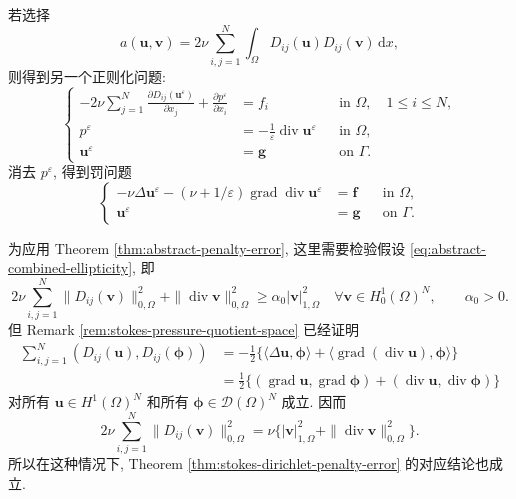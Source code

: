 \setcounter{statement}{3}
\begin{Remark}\label{rem:stokes-dirichlet-strain-penalty}
若选择
\[
a(\mathbf{u},\mathbf{v})
=2\nu\sum_{i,j=1}^{N}
\int_\Omega
D_{ij}(\mathbf{u})D_{ij}(\mathbf{v})\,\mathrm{d}x,
\]
则得到另一个正则化问题:
\[
\left\{
\begin{aligned}
-2\nu\sum_{j=1}^{N}
\frac{\partial D_{ij}(\mathbf{u}^\varepsilon)}
{\partial x_j}
+\frac{\partial p^\varepsilon}{\partial x_i}
&=f_i
&&\text{in }\Omega,\quad 1\le i\le N,\\
p^\varepsilon
&=-\frac1\varepsilon
\operatorname{div}\mathbf{u}^\varepsilon
&&\text{in }\Omega,\\
\mathbf{u}^\varepsilon&=\mathbf{g}
&&\text{on }\Gamma.
\end{aligned}
\right.
\]
消去 $p^\varepsilon$, 得到罚问题
\[
\left\{
\begin{aligned}
-\nu\Delta\mathbf{u}^\varepsilon
-(\nu+1/\varepsilon)
\operatorname{grad}\operatorname{div}\mathbf{u}^\varepsilon
&=\mathbf{f}
&&\text{in }\Omega,\\
\mathbf{u}^\varepsilon&=\mathbf{g}
&&\text{on }\Gamma.
\end{aligned}
\right.
\]

为应用 Theorem \ref{thm:abstract-penalty-error}, 这里需要检验假设
\eqref{eq:abstract-combined-ellipticity}, 即
\begin{equation}\label{eq:stokes-strain-penalty-coercivity}
2\nu\sum_{i,j=1}^{N}
\|D_{ij}(\mathbf{v})\|_{0,\Omega}^2
+\|\operatorname{div}\mathbf{v}\|_{0,\Omega}^2
\ge
\alpha_0|\mathbf{v}|_{1,\Omega}^2
\quad
\forall\mathbf{v}\in H_0^1(\Omega)^N,
\qquad \alpha_0>0.
\end{equation}
但 Remark \ref{rem:stokes-pressure-quotient-space} 已经证明
\[
\begin{aligned}
\sum_{i,j=1}^{N}
(D_{ij}(\mathbf{u}),D_{ij}(\boldsymbol{\phi}))
&=-\frac12\{
\langle\Delta\mathbf{u},\boldsymbol{\phi}\rangle
+\langle
\operatorname{grad}(\operatorname{div}\mathbf{u}),
\boldsymbol{\phi}
\rangle\}\\
&=\frac12\{
(\operatorname{grad}\mathbf{u},
\operatorname{grad}\boldsymbol{\phi})
+(\operatorname{div}\mathbf{u},
\operatorname{div}\boldsymbol{\phi})
\}
\end{aligned}
\]
对所有 $\mathbf{u}\in H^1(\Omega)^N$ 和所有
$\boldsymbol{\phi}\in\mathcal{D}(\Omega)^N$ 成立. 因而
\begin{equation}\label{eq:stokes-strain-korn-h0-identity}
2\nu\sum_{i,j=1}^{N}
\|D_{ij}(\mathbf{v})\|_{0,\Omega}^2
=
\nu\{
|\mathbf{v}|_{1,\Omega}^2
+\|\operatorname{div}\mathbf{v}\|_{0,\Omega}^2
\}.
\end{equation}
所以在这种情况下, Theorem
\ref{thm:stokes-dirichlet-penalty-error} 的对应结论也成立.
\end{Remark}

